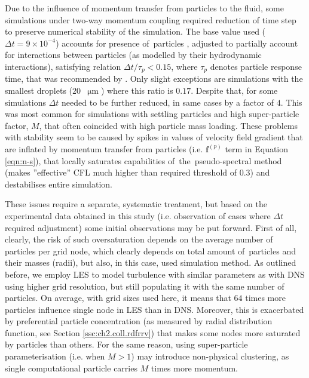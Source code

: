 \documentclass{pracamgren}
\begin{document}
Due to the influence of momentum transfer from particles to the fluid, some simulations under two-way momentum coupling required reduction of time step to preserve numerical stability of the simulation.
The base value used ($\Delta t = 9 \times 10^{-4}$) accounts for presence of~particles \parencite{Zhou2001}, adjusted to partially account for interactions between particles (as modelled by their hydrodynamic interactions), satisfying relation $\Delta t / \tau_p < 0.15$, where $\tau_p$ denotes particle response time, that was recommended by \textcite{Ayala2007}.
Only slight exceptions are simulations with the smallest droplets ($20$~$\upmu\text{m}$) where this ratio is $0.17$. 
Despite that, for some simulations $\Delta t$ needed to be further reduced, in same cases by a factor of $4$.
This was most common for simulations with settling particles and high super-particle factor, $M$, that often coincided with high particle mass loading.
These problems with stability seem to be caused by spikes in values of velocity field gradient that are inflated by momentum transfer from particles (i.e. $\mathbf{f}^{(p)}$ term in Equation \ref{eqn:n-s}), that locally saturates capabilities of~the~pseudo-spectral method (makes ''effective'' CFL much higher than required threshold of $0.3$) and destabilises entire simulation.

These issues require a separate, systematic treatment, but based on the experimental data obtained in this study (i.e. observation of cases where $\Delta t$ required adjustment) some initial observations may be put forward.
First of all, clearly, the risk of such oversaturation depends on the average number of particles per grid node, which clearly depends on total amount of~particles and their masses (radii), but also, in this case, used simulation method.
As outlined before, we employ LES to model turbulence with similar parameters as with DNS using higher grid resolution, but still populating it with the same number of particles.
On average, with grid sizes used here, it means that $64$ times more particles influence single node in LES than in DNS.
Moreover, this is exacerbated by preferential particle concentration (as measured by radial distribution function, see Section \ref{ssc:ch2.coll.rdfrrv}) that makes some nodes more saturated by particles than others.
For the same reason, using super-particle parameterisation (i.e. when $M > 1$) may introduce non-physical clustering, as single computational particle carries $M$ times more momentum.
\end{document}
